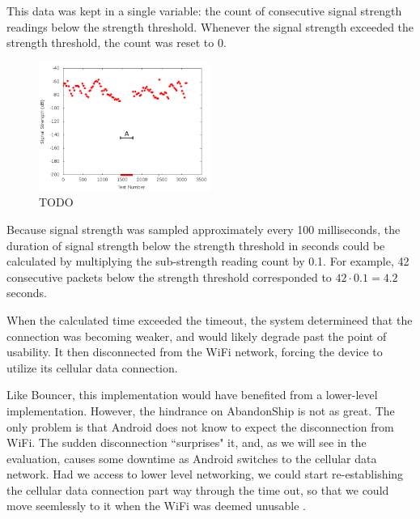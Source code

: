 This data was kept in a single variable: the count of consecutive signal strength readings below the strength threshold. Whenever the signal strength exceeded the strength threshold, the count was reset to 0.

\begin{figure}
	\includegraphics[width=0.5\textwidth]{sigStrength}
	\caption{TODO}
\end{figure}

Because signal strength was sampled approximately every 100 milliseconds, the duration of signal strength below the strength threshold in seconds could be calculated by multiplying the sub-strength reading count by 0.1. For example, 42 consecutive packets below the strength threshold corresponded to $ 42 \cdot 0.1 = 4.2 $ seconds.

When the calculated time exceeded the timeout, the system determineed that the connection was becoming weaker, and would likely degrade past the point of usability. It then disconnected from the WiFi network, forcing the device to utilize its cellular data connection.

Like Bouncer, this implementation would have benefited from a lower-level implementation. However, the hindrance on AbandonShip is not as great. The only problem is that Android does not know to expect the disconnection from WiFi. The sudden disconnection ``surprises" it, and, as we will see in the evaluation, causes some downtime as Android switches to the cellular data network. Had we access to lower level networking, we could start re-establishing the cellular data connection part way through the time out, so that we could move seemlessly to it when the WiFi was deemed unusable
.